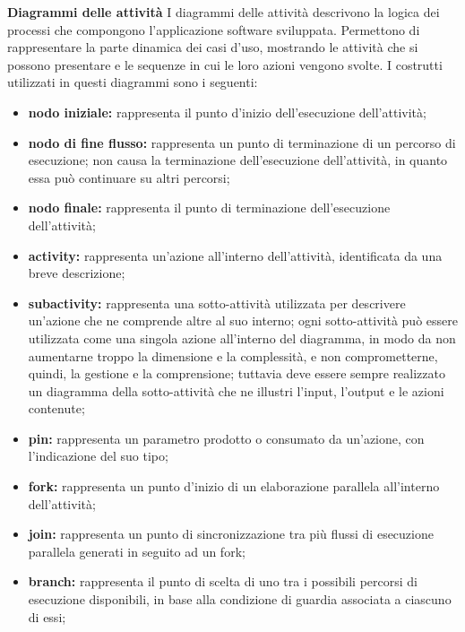 						\textbf{Diagrammi delle attività}
						\newline
						\newline
						\hangindent=0.6cm I diagrammi delle attività descrivono la logica dei processi che compongono l'applicazione software sviluppata. Permettono di rappresentare la parte dinamica dei casi d'uso, mostrando le attività che si possono presentare e le sequenze in cui le loro azioni vengono svolte.
						\newline
						\hangindent=0.6cm I costrutti utilizzati in questi diagrammi sono i seguenti:
						\begin{itemize}[leftmargin=1.5cm]
							\item \textbf{nodo iniziale:} rappresenta il punto d'inizio dell'esecuzione dell'attività;
							\item \textbf{nodo di fine flusso:} rappresenta un punto di terminazione di un percorso di esecuzione; non causa la terminazione dell'esecuzione dell'attività, in quanto essa può continuare su altri percorsi; 
							\item \textbf{nodo finale:} rappresenta il punto di terminazione dell'esecuzione dell'attività;
							\item \textbf{activity:} rappresenta un'azione all'interno dell'attività, identificata da una breve descrizione;
							\item \textbf{subactivity:} rappresenta una sotto-attività utilizzata per descrivere un'azione che ne comprende altre al suo interno; ogni sotto-attività può essere utilizzata come una singola azione all'interno del diagramma, in modo da non aumentarne troppo la dimensione e la complessità, e non comprometterne, quindi, la gestione e la comprensione; tuttavia deve essere sempre realizzato un diagramma della sotto-attività che ne illustri l'input, l'output e le azioni contenute;
							\item \textbf{pin:} rappresenta un parametro prodotto o consumato da un'azione, con l'indicazione del suo tipo;
							\item \textbf{fork:} rappresenta un punto d'inizio di un elaborazione parallela all'interno dell'attività;
							\item \textbf{join:} rappresenta un punto di sincronizzazione tra più flussi di esecuzione parallela generati in seguito ad un fork;
							\item \textbf{branch:} rappresenta il punto di scelta di uno tra i possibili percorsi di esecuzione disponibili, in base alla condizione di guardia associata a ciascuno di essi;

\end{itemize}
